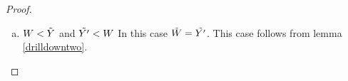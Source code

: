 \documentclass[10pt,a4paper]{scrartcl}
\begin{document}
\begin{proof}
\begin{enumerate}[(i)]
\begin{enumerate} [(a)]
\begin{center}
[.80]
[.80]
[.80]
[.80]
[.80]
[.80]
[.40]
\end{center}
\noindent
Latest thinking: We definitely need to remove the $B_{j_i}$ from this diagram -- they are not implied bu the inductive hypothesis. 
\noindent Questions: Should we remove $A_i$ from the above diagram? Do we use the $a_i$  at all? Do we need to? Are they there as harmless implied dependencies.
\noindent
Define $g: D \morph Y$ and $g': D \morph Y'$. Then we can easily show that
\begin{equation}
g \circ \pbase{D}{Y}{W} = g \circ \pbase{D}{Y}{W}
\end{equation}
    
\item $W < \tilde{Y}$ and $\tilde{Y'} < W$
In this case $\tilde{W} = \tilde{Y'}$.
This case follows from lemma \ref{drilldowntwo}.



\end{enumerate}
\end{enumerate}
\end{proof}
\end{document}

